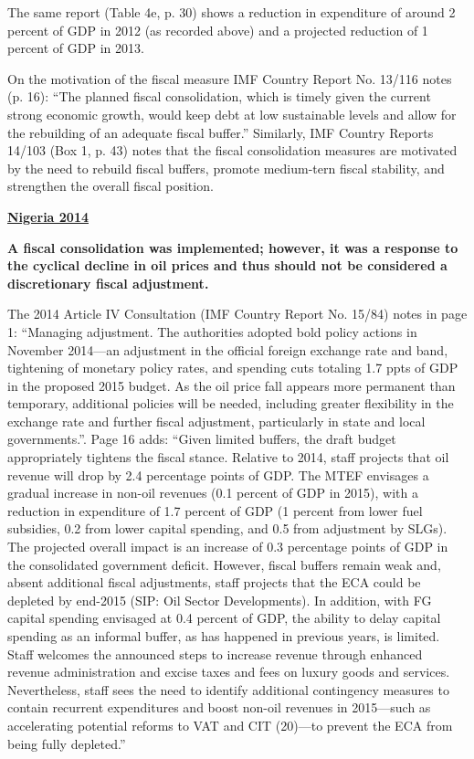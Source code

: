 The same report (Table 4e, p. 30) shows a reduction in expenditure of around 2 percent of GDP in 2012 (as recorded above) and a projected reduction of 1 percent of GDP in 2013.

On the motivation of the fiscal measure IMF Country Report No. 13/116 notes (p. 16): “The planned fiscal consolidation, which is timely given the current strong economic growth, would keep debt at low sustainable levels and allow for the rebuilding of an adequate fiscal buffer.” Similarly, IMF Country Reports 14/103 (Box 1, p. 43) notes that the fiscal consolidation measures are motivated by the need to rebuild fiscal buffers, promote medium-tern fiscal stability, and strengthen the overall fiscal position.

\textbf{\underline{Nigeria 2014}}

\textbf{A fiscal consolidation was implemented; however, it was a response to the cyclical decline in oil prices and thus should not be considered a discretionary fiscal adjustment.}

The 2014 Article IV Consultation (IMF Country Report No. 15/84) notes in page 1: “Managing adjustment. The authorities adopted bold policy actions in November 2014—an adjustment in the official foreign exchange rate and band, tightening of monetary policy rates, and spending cuts totaling 1.7 ppts of GDP in the proposed 2015 budget. As the oil price fall appears more permanent than temporary, additional policies will be needed, including greater flexibility in the exchange rate and further fiscal adjustment, particularly in state and local governments.”. Page 16 adds: “Given limited buffers, the draft budget appropriately tightens the fiscal stance. Relative to 2014, staff projects that oil revenue will drop by 2.4 percentage points of GDP. The MTEF envisages a gradual increase in non-oil revenues (0.1 percent of GDP in 2015), with a reduction in expenditure of 1.7 percent of GDP (1 percent from lower fuel subsidies, 0.2 from lower capital spending, and 0.5 from adjustment by SLGs). The projected overall impact is an increase of 0.3 percentage points of GDP in the consolidated government deficit. However, fiscal buffers remain weak and, absent additional fiscal adjustments, staff projects that the ECA could be depleted by end-2015 (SIP: Oil Sector Developments). In addition, with FG capital spending envisaged at 0.4 percent of GDP, the ability to delay capital spending as an informal buffer, as has happened in previous years, is limited. Staff welcomes the announced steps to increase revenue through enhanced revenue administration and excise taxes and fees on luxury goods and services. Nevertheless, staff sees the need to identify additional contingency measures to contain recurrent expenditures and boost non-oil revenues in 2015—such as accelerating potential reforms to VAT and CIT (20)—to prevent the ECA from being fully depleted.”

